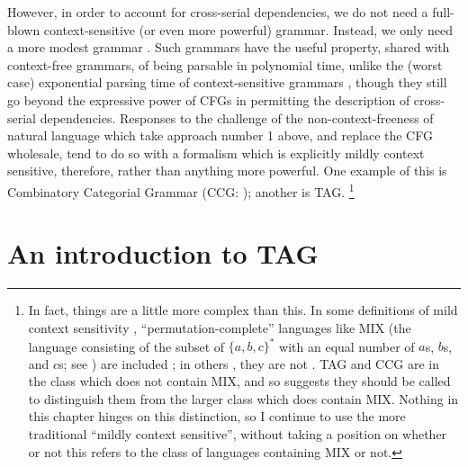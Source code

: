 \documentclass[output=paper,hidelinks]{langscibook}
\begin{document}
However, in order to account for cross-serial dependencies, we do not need a
full-blown context-sensitive (or even more powerful) grammar. Instead, we only
need a more modest  grammar \citep{joshi1985}. Such
grammars have the useful property, shared with context-free grammars, of being
parsable in polynomial time, unlike the (worst case) exponential parsing time of
context-sensitive grammars
\citep{joshi:parsing,vijayshanker:computational-properties}, though they still
go beyond the expressive power of CFGs in permitting the description of
cross-serial dependencies. Responses to the challenge of the
non-context-freeness of natural language which take approach number 1 above,
and replace the CFG wholesale, tend to do so with a formalism which is
explicitly mildly context sensitive, therefore, rather than anything more
powerful. One example of this is Combinatory Categorial Grammar (CCG:
\citealp{steedman87,steedman2000ccg}); another is TAG.%
%
\footnote{\label{fn:mix}In fact, things are a little more complex than this. In some
  definitions of mild context sensitivity \citep[e.g.][23--24]{Kallmeyer2010},
  ``permutation-complete'' languages like MIX (the language consisting of the
  subset of $\{a,b,c\}^*$ with an equal number of $a$s, $b$s, and $c$s; see
  \citealt{bach1981}) are included \citep{salvati2015,nederhof2016}; in others
  \citep[e.g.][]{joshi-etal1991}, they are not \citep{kanazawa-salvati2012}. TAG
  and CCG are in the class which does not contain MIX, and so
  \citet[415]{steedman2019} suggests they should be called  to distinguish them from the larger class which does
  contain MIX. Nothing in this chapter hinges on this distinction, so I continue
  to use the more traditional ``mildly context sensitive'', without taking a
  position on whether or not this refers to the class of languages containing
  MIX or not.}


\section{An introduction to TAG}\label{sec:TAG:intro-to-tag}
\end{document}
